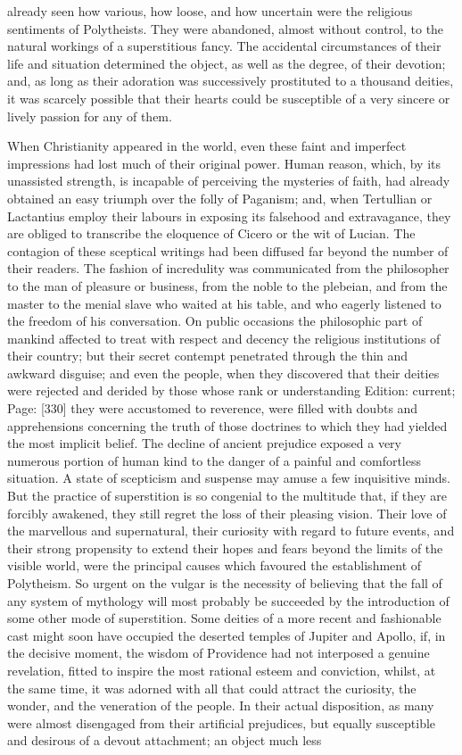already seen how various, how loose, and how uncertain were the religious sentiments of Polytheists. They were abandoned, almost without control, to the natural workings of a superstitious fancy. The accidental circumstances of their life and situation determined the object, as well as the degree, of their devotion; and, as long as their adoration was successively prostituted to a thousand deities, it was scarcely possible that their hearts could be susceptible of a very sincere or lively passion for any of them.

When Christianity appeared in the world, even these faint and imperfect impressions had lost much of their original power. Human reason, which, by its unassisted strength, is incapable of perceiving the mysteries of faith, had already obtained an easy triumph over the folly of Paganism; and, when Tertullian or Lactantius employ their labours in exposing its falsehood and extravagance, they are obliged to transcribe the eloquence of Cicero or the wit of Lucian. The contagion of these sceptical writings had been diffused far beyond the number of their readers. The fashion of incredulity was communicated from the philosopher to the man of pleasure or business, from the noble to the plebeian, and from the master to the menial slave who waited at his table, and who eagerly listened to the freedom of his conversation. On public occasions the philosophic part of mankind affected to treat with respect and decency the religious institutions of their country; but their secret contempt penetrated through the thin and awkward disguise; and even the people, when they discovered that their deities were rejected and derided by those whose rank or understanding Edition: current; Page: [330] they were accustomed to reverence, were filled with doubts and apprehensions concerning the truth of those doctrines to which they had yielded the most implicit belief. The decline of ancient prejudice exposed a very numerous portion of human kind to the danger of a painful and comfortless situation. A state of scepticism and suspense may amuse a few inquisitive minds. But the practice of superstition is so congenial to the multitude that, if they are forcibly awakened, they still regret the loss of their pleasing vision. Their love of the marvellous and supernatural, their curiosity with regard to future events, and their strong propensity to extend their hopes and fears beyond the limits of the visible world, were the principal causes which favoured the establishment of Polytheism. So urgent on the vulgar is the necessity of believing that the fall of any system of mythology will most probably be succeeded by the introduction of some other mode of superstition. Some deities of a more recent and fashionable cast might soon have occupied the deserted temples of Jupiter and Apollo, if, in the decisive moment, the wisdom of Providence had not interposed a genuine revelation, fitted to inspire the most rational esteem and conviction, whilst, at the same time, it was adorned with all that could attract the curiosity, the wonder, and the veneration of the people. In their actual disposition, as many were almost disengaged from their artificial prejudices, but equally susceptible and desirous of a devout attachment; an object much less 